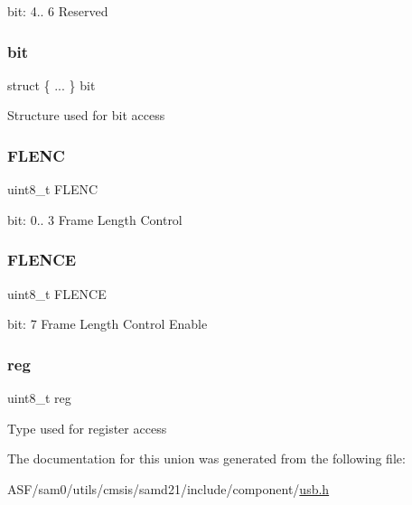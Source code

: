 bit\+: 4.. 6 Reserved \mbox{\label{union_u_s_b___h_o_s_t___h_s_o_f_c___type_ac39328f7e4a34eab8c0e5d15e9cea99b}} 
\subsubsection{\texorpdfstring{bit}{bit}}
{\footnotesize\ttfamily struct \{ ... \}   bit}

Structure used for bit access \mbox{\label{union_u_s_b___h_o_s_t___h_s_o_f_c___type_a825bf5741bf988b6171a1c41025e5af9}} 
\subsubsection{\texorpdfstring{FLENC}{FLENC}}
{\footnotesize\ttfamily uint8\+\_\+t F\+L\+E\+NC}

bit\+: 0.. 3 Frame Length Control \mbox{\label{union_u_s_b___h_o_s_t___h_s_o_f_c___type_ac39c6a845c103e5f50e3798563b68987}} 
\subsubsection{\texorpdfstring{FLENCE}{FLENCE}}
{\footnotesize\ttfamily uint8\+\_\+t F\+L\+E\+N\+CE}

bit\+: 7 Frame Length Control Enable \mbox{\label{union_u_s_b___h_o_s_t___h_s_o_f_c___type_a9428adc9af4653a2050e2536b55dec8d}} 
\subsubsection{\texorpdfstring{reg}{reg}}
{\footnotesize\ttfamily uint8\+\_\+t reg}

Type used for register access 

The documentation for this union was generated from the following file\+:\begin{DoxyCompactItemize}
\item 
A\+S\+F/sam0/utils/cmsis/samd21/include/component/\mbox{\hyperlink{component_2usb_8h}{usb.\+h}}\end{DoxyCompactItemize}
